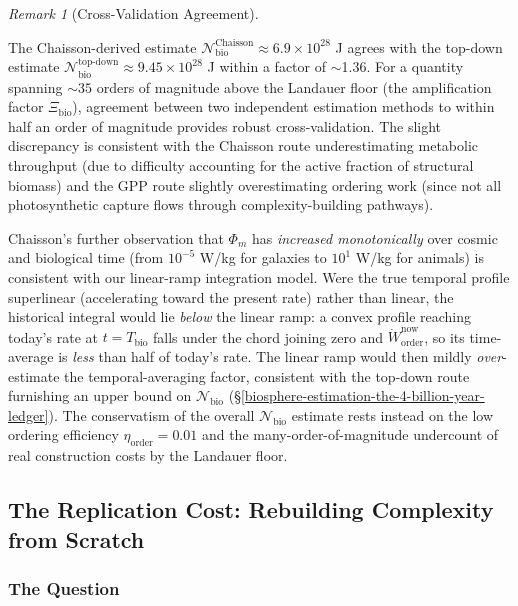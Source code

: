 \documentclass[11pt]{article}
\theoremstyle{plain}
\theoremstyle{definition}
\theoremstyle{remark}
\newtheorem{remark}{Remark}
\let\origsubsection\subsection
\renewcommand{\subsection}{\needspace{7\baselineskip}\origsubsection}
\let\origsubsubsection\subsubsection
\renewcommand{\subsubsection}{\needspace{4\baselineskip}\origsubsubsection}
\begin{document}
\begin{remark}[Cross-Validation Agreement]
\label{rem-chaisson-cross-validation}

The Chaisson-derived estimate $\mathcal{N}_{\text{bio}}^{\text{Chaisson}} \approx 6.9 \times 10^{28}$ J agrees with the top-down estimate $\mathcal{N}_{\text{bio}}^{\text{top-down}} \approx 9.45 \times 10^{28}$ J within a factor of $\sim$1.36. For a quantity spanning $\sim 35$ orders of magnitude above the Landauer floor (the amplification factor $\Xi_{\text{bio}}$), agreement between two independent estimation methods to within half an order of magnitude provides robust cross-validation. The slight discrepancy is consistent with the Chaisson route underestimating metabolic throughput (due to difficulty accounting for the active fraction of structural biomass) and the GPP route slightly overestimating ordering work (since not all photosynthetic capture flows through complexity-building pathways).
\end{remark}

Chaisson's further observation that \(\Phi_m\) has \emph{increased
monotonically} over cosmic and biological time (from \(10^{-5}\) W/kg
for galaxies to \(10^{1}\) W/kg for animals) is consistent with our
linear-ramp integration model. Were the true temporal profile
superlinear (accelerating toward the present rate) rather than linear,
the historical integral would lie \emph{below} the linear ramp: a convex
profile reaching today's rate at \(t = T_{\text{bio}}\) falls under the
chord joining zero and \(\dot{W}_{\text{order}}^{\text{now}}\), so its
time-average is \emph{less} than half of today's rate. The linear ramp
would then mildly \emph{over}-estimate the temporal-averaging factor,
consistent with the top-down route furnishing an upper bound on
\(\mathcal{N}_{\text{bio}}\)
(§\ref{biosphere-estimation-the-4-billion-year-ledger}). The
conservatism of the overall \(\mathcal{N}_{\text{bio}}\) estimate rests
instead on the low ordering efficiency \(\eta_{\text{order}} = 0.01\)
and the many-order-of-magnitude undercount of real construction costs by
the Landauer floor.

\subsection{The Replication Cost: Rebuilding Complexity from
Scratch}\label{the-replication-cost-rebuilding-complexity-from-scratch}

\subsubsection{The Question}\label{the-question}
\end{document}

